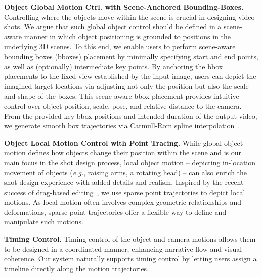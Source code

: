 
\textbf{Object Global Motion Ctrl. with Scene-Anchored Bounding-Boxes.}
Controlling where the objects move within the scene is crucial in designing video shots. 
We argue that such global object control should be defined in a scene-aware manner in which object positioning is grounded to positions in the underlying 3D scenes.
To this end, we enable users to perform scene-aware bounding boxes (bboxes) placement by minimally specifying start and end points, as well as (optionally) intermediate key points. 
By anchoring the bbox placements to the fixed view established by the input image, users can depict the imagined target locations via adjusting not only the position but also the scale and shape of the boxes. This scene-aware bbox placement provides intuitive control over object position, scale, pose, and relative distance to the camera.
From the provided key bbox positions and intended duration of the output video, we generate smooth box trajectories via Catmull-Rom spline interpolation~\cite{catmull1974class}. 

\textbf{Object Local Motion Control with Point Tracing.}
While global object motion defines how objects change their position within the scene and is our main focus in the shot design process, local object motion -- depicting in-location movement of objects (\textit{e.g.}, raising arms, a rotating head) -- can also enrich the shot design experience with added details and realism.
Inspired by the recent success of drag-based editing~\cite{wu2025draganything,mou2024revideo}, we use sparse point trajectories to depict local motions. As local motion often involves complex geometric relationships and deformations, sparse point trajectories offer a flexible way to define and manipulate such motions.

\textbf{Timing Control}.
Timing control of the object and camera motions allows them to be designed in a coordinated manner, enhancing narrative flow and visual coherence. Our system naturally supports timing control by letting users assign a timeline directly along the motion trajectories.

